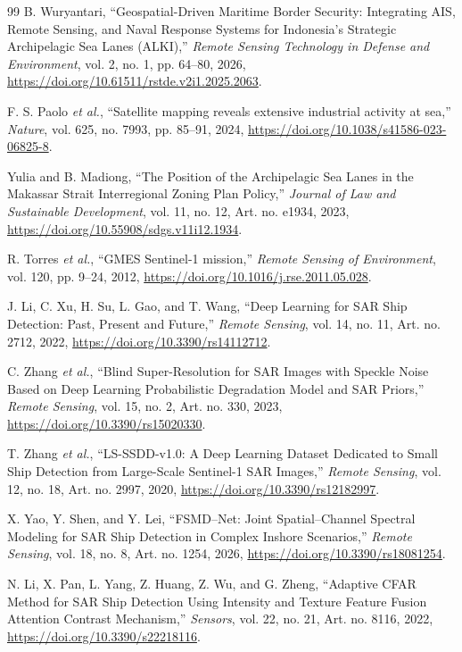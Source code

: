 \documentclass[conference]{IEEEtran}
\begin{document}
\begin{thebibliography}{99}
	 B. Wuryantari, ``Geospatial-Driven Maritime Border Security: Integrating AIS, Remote Sensing, and Naval Response Systems for Indonesia’s Strategic Archipelagic Sea Lanes (ALKI),'' \emph{Remote Sensing Technology in Defense and Environment}, vol. 2, no. 1, pp. 64--80, 2026, \url{https://doi.org/10.61511/rstde.v2i1.2025.2063}.

	 F. S. Paolo \textit{et al.}, ``Satellite mapping reveals extensive industrial activity at sea,'' \emph{Nature}, vol. 625, no. 7993, pp. 85--91, 2024, \url{https://doi.org/10.1038/s41586-023-06825-8}.

	 Yulia and B. Madiong, ``The Position of the Archipelagic Sea Lanes in the Makassar Strait Interregional Zoning Plan Policy,'' \emph{Journal of Law and Sustainable Development}, vol. 11, no. 12, Art. no. e1934, 2023, \url{https://doi.org/10.55908/sdgs.v11i12.1934}.

	 R. Torres \textit{et al.}, ``GMES Sentinel-1 mission,'' \emph{Remote Sensing of Environment}, vol. 120, pp. 9--24, 2012, \url{https://doi.org/10.1016/j.rse.2011.05.028}.

	 J. Li, C. Xu, H. Su, L. Gao, and T. Wang, ``Deep Learning for SAR Ship Detection: Past, Present and Future,'' \emph{Remote Sensing}, vol. 14, no. 11, Art. no. 2712, 2022, \url{https://doi.org/10.3390/rs14112712}.

	 C. Zhang \textit{et al.}, ``Blind Super-Resolution for SAR Images with Speckle Noise Based on Deep Learning Probabilistic Degradation Model and SAR Priors,'' \emph{Remote Sensing}, vol. 15, no. 2, Art. no. 330, 2023, \url{https://doi.org/10.3390/rs15020330}.

	 T. Zhang \textit{et al.}, ``LS-SSDD-v1.0: A Deep Learning Dataset Dedicated to Small Ship Detection from Large-Scale Sentinel-1 SAR Images,'' \emph{Remote Sensing}, vol. 12, no. 18, Art. no. 2997, 2020, \url{https://doi.org/10.3390/rs12182997}.

	 X. Yao, Y. Shen, and Y. Lei, ``FSMD–Net: Joint Spatial–Channel Spectral Modeling for SAR Ship Detection in Complex Inshore Scenarios,'' \emph{Remote Sensing}, vol. 18, no. 8, Art. no. 1254, 2026, \url{https://doi.org/10.3390/rs18081254}.

	 N. Li, X. Pan, L. Yang, Z. Huang, Z. Wu, and G. Zheng, ``Adaptive CFAR Method for SAR Ship Detection Using Intensity and Texture Feature Fusion Attention Contrast Mechanism,'' \emph{Sensors}, vol. 22, no. 21, Art. no. 8116, 2022, \url{https://doi.org/10.3390/s22218116}.


\end{thebibliography}
\end{document}
